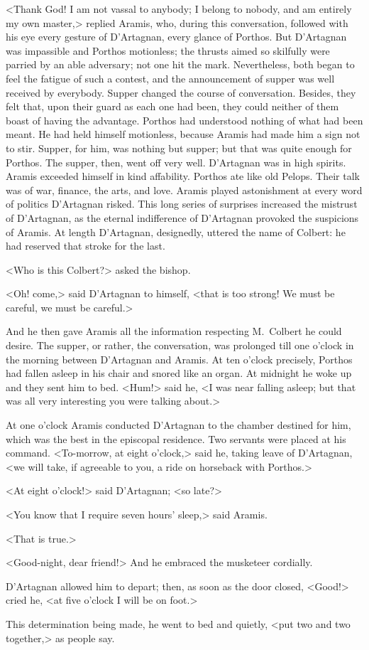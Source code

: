 <Thank God! I am not vassal to anybody; I belong to nobody, and am entirely my own master,> replied Aramis, who, during this conversation, followed with his eye every gesture of D'Artagnan, every glance of Porthos. But D'Artagnan was impassible and Porthos motionless; the thrusts aimed so skilfully were parried by an able adversary; not one hit the mark. Nevertheless, both began to feel the fatigue of such a contest, and the announcement of supper was well received by everybody. Supper changed the course of conversation. Besides, they felt that, upon their guard as each one had been, they could neither of them boast of having the advantage. Porthos had understood nothing of what had been meant. He had held himself motionless, because Aramis had made him a sign not to stir. Supper, for him, was nothing but supper; but that was quite enough for Porthos. The supper, then, went off very well. D'Artagnan was in high spirits. Aramis exceeded himself in kind affability. Porthos ate like old Pelops. Their talk was of war, finance, the arts, and love. Aramis played astonishment at every word of politics D'Artagnan risked. This long series of surprises increased the mistrust of D'Artagnan, as the eternal indifference of D'Artagnan provoked the suspicions of Aramis. At length D'Artagnan, designedly, uttered the name of Colbert: he had reserved that stroke for the last.

<Who is this Colbert?> asked the bishop.

<Oh! come,> said D'Artagnan to himself, <that is too strong! We must be careful,  we must be careful.>

And he then gave Aramis all the information respecting M.~Colbert he could desire. The supper, or rather, the conversation, was prolonged till one o'clock in the morning between D'Artagnan and Aramis. At ten o'clock precisely, Porthos had fallen asleep in his chair and snored like an organ. At midnight he woke up and they sent him to bed. <Hum!> said he, <I was near falling asleep; but that was all very interesting you were talking about.>

At one o'clock Aramis conducted D'Artagnan to the chamber destined for him, which was the best in the episcopal residence. Two servants were placed at his command. <To-morrow, at eight o'clock,> said he, taking leave of D'Artagnan, <we will take, if agreeable to you, a ride on horseback with Porthos.>

<At eight o'clock!> said D'Artagnan; <so late?>

<You know that I require seven hours' sleep,> said Aramis.

<That is true.>

<Good-night, dear friend!> And he embraced the musketeer cordially.

D'Artagnan allowed him to depart; then, as soon as the door closed, <Good!> cried he, <at five o'clock I will be on foot.>

This determination being made, he went to bed and quietly, <put two and two together,> as people say. 